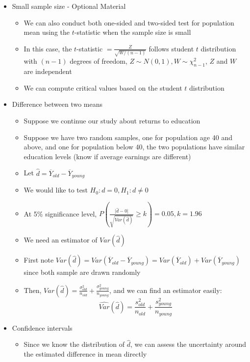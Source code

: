 \documentclass{article}
\begin{document}
\begin{itemize}
    \item Small sample size - Optional Material
    \begin{itemize}
        \item We can also conduct both one-sided and two-sided test for population mean using the $t$-statistic when the sample size is small
        \item In this case, the $t$-statistic $= \frac{Z}{\sqrt{W/(n-1)}}$ follows student $t$ distribution with $(n-1)$ degrees of freedom, $Z \sim N(0,1), W \sim \chi_{n-1}^2$, $Z$ and $W$ are independent
        \item We can compute critical values based on the student $t$ distribution
    \end{itemize}
    \item Difference between two means
    \begin{itemize}
        \item Suppose we continue our study about returns to education
        \item Suppose we have two random samples, one for population age 40 and above, and one for population below 40, the two populations have similar education levels (know if average earnings are different)
        \item Let $\hat{d} = \overline{Y}_{old} - \overline{Y}_{young}$
        \item We would like to test $H_0: d=0, H_1: d \neq 0$
        \item At 5\% significance level, $P\left( \frac{\vert \hat{d} - 0 \vert}{\sqrt{Var(\hat{d})}} \ge k \right) = 0.05, k = 1.96$
        \item We need an estimator of $Var(\hat{d})$
        \item First note $Var(\hat{d}) = Var(\overline{Y}_{old} - \overline{Y}_{young}) = Var(\overline{Y}_{old}) + Var(\overline{Y}_{young})$ since both sample are drawn randomly
        \item Then, $Var(\hat{d}) = \frac{\sigma_{old}^2}{n_{old}} + \frac{\sigma_{young}^2}{n_{young}}$, and we can find an estimator easily:
        \[
        \hat{Var}(\hat{d}) = \frac{s_{old}^2}{n_{old}} + \frac{s_{young}^2}{n_{young}}
        \]
    \end{itemize}
    \item Confidence intervals
    \begin{itemize}
        \item Since we know the distribution of $\hat{d}$, we can assess the uncertainty around the estimated difference in mean directly

\end{itemize}
\end{itemize}
\end{document}
